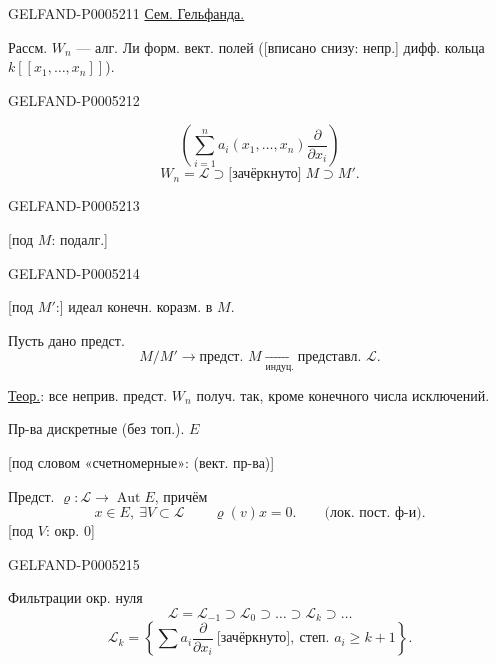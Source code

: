 \begin{GelfandAdjacentEvidence}{GELFAND-P000521}{1}
\qquad \uline{Сем. Гельфанда.}

\qquad
{}

Рассм. $W_n$ — алг. Ли форм. вект. полей
([вписано снизу: непр.] дифф. кольца $k[[x_1,\ldots,x_n]]$).
\end{GelfandAdjacentEvidence}
\begin{GelfandAdjacentEvidence}{GELFAND-P000521}{2}

\[
\left(\sum_{i=1}^{n}a_i(x_1,\ldots,x_n)\frac{\partial}{\partial x_i}\right)
\]
\[
W_n=\mathcal L\supset \text{[зачёркнуто]}\;M\supset M'.
\]
\end{GelfandAdjacentEvidence}
\begin{GelfandAdjacentEvidence}{GELFAND-P000521}{3}

[под $M$: подалг.]
\end{GelfandAdjacentEvidence}
\begin{GelfandAdjacentEvidence}{GELFAND-P000521}{4}

[под $M'$:] идеал конечн. коразм. в $M$.

Пусть дано предст. 
\[
M/M'\longrightarrow\text{предст. }M
\underset{\text{индуц.}}{\longrightarrow}\text{представл. }\mathcal L.
\]

\uline{Теор.}: все неприв. предст. $W_n$ получ. так, кроме конечного числа исключений.

Пр-ва  дискретные (без топ.). $E$

[под словом «счетномерные»: (вект. пр-ва)]

Предст. $\varrho:\mathcal L\longrightarrow\operatorname{Aut}E$, причём
\[
x\in E,\ \exists V\subset\mathcal L\qquad \varrho(v)x=0.
\qquad\text{(лок. пост. ф-и).}
\]
[под $V$: окр. $0$]
\end{GelfandAdjacentEvidence}
\begin{GelfandAdjacentEvidence}{GELFAND-P000521}{5}


Фильтрации окр. нуля
\[
\mathcal L=\mathcal L_{-1}\supset\mathcal L_0\supset\ldots
\supset\mathcal L_k\supset\ldots
\]
\[
\mathcal L_k=\left\{\sum a_i\frac{\partial}{\partial x_i}\
\text{[зачёркнуто]},\ \text{степ. }a_i\geqslant k+1\right\}.
\]
\end{GelfandAdjacentEvidence}
